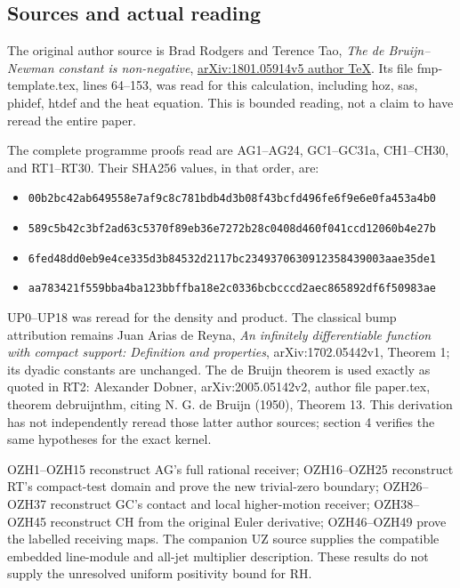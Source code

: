 \documentclass[
  10pt,
  a4paper,
]{article}
\providecommand{\tightlist}{%
  \setlength{\itemsep}{0pt}\setlength{\parskip}{0pt}}
\begin{document}
\subsection{Sources and actual
reading}\label{sources-and-actual-reading}

The original author source is Brad Rodgers and Terence Tao, \emph{The de
Bruijn--Newman constant is non-negative},
\href{https://arxiv.org/src/1801.05914v5}{arXiv:1801.05914v5 author
TeX}. Its file fmp-template.tex, lines 64--153, was read for this
calculation, including hoz, sas, phidef, htdef and the heat equation.
This is bounded reading, not a claim to have reread the entire paper.

The complete programme proofs read are AG1--AG24, GC1--GC31a, CH1--CH30,
and RT1--RT30. Their SHA256 values, in that order, are:

\begin{itemize}
\tightlist
\item
  \texttt{00b2bc42\allowbreak{}ab649558\allowbreak{}e7af9c8c\allowbreak{}781bdb4d\allowbreak{}3b08f43b\allowbreak{}cfd496fe\allowbreak{}6f9e6e0f\allowbreak{}a453a4b0}
\item
  \texttt{589c5b42\allowbreak{}c3bf2ad6\allowbreak{}3c5370f8\allowbreak{}9eb36e72\allowbreak{}72b28c04\allowbreak{}08d460f0\allowbreak{}41ccd120\allowbreak{}60b4e27b}
\item
  \texttt{6fed48dd\allowbreak{}0eb9e4ce\allowbreak{}335d3b84\allowbreak{}532d2117\allowbreak{}bc234937\allowbreak{}06309123\allowbreak{}58439003\allowbreak{}aae35de1}
\item
  \texttt{aa783421\allowbreak{}f559bba4\allowbreak{}ba123bbf\allowbreak{}fba18e2c\allowbreak{}0336bcbc\allowbreak{}ccd2aec8\allowbreak{}65892df6\allowbreak{}f50983ae}
\end{itemize}

UP0--UP18 was reread for the density and product. The classical bump
attribution remains Juan Arias de Reyna, \emph{An infinitely
differentiable function with compact support: Definition and
properties}, arXiv:1702.05442v1, Theorem 1; its dyadic constants are
unchanged. The de Bruijn theorem is used exactly as quoted in RT2:
Alexander Dobner, arXiv:2005.05142v2, author file paper.tex, theorem
debruijnthm, citing N. G. de Bruijn (1950), Theorem 13. This derivation
has not independently reread those latter author sources; section 4
verifies the same hypotheses for the exact kernel.

OZH1--OZH15 reconstruct AG's full rational receiver; OZH16--OZH25
reconstruct RT's compact-test domain and prove the new trivial-zero
boundary; OZH26--OZH37 reconstruct GC's contact and local higher-motion
receiver; OZH38--OZH45 reconstruct CH from the original Euler
derivative; OZH46--OZH49 prove the labelled receiving maps. The
companion UZ source supplies the compatible embedded line-module and
all-jet multiplier description. These results do not supply the
unresolved uniform positivity bound for RH.
\end{document}
